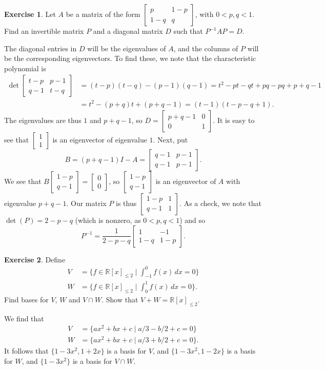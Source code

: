 \documentclass[a4paper]{amsart}
\newcommand{\R}         {{\mathbb{R}}}
\newcommand{\bsm}       {\left[\begin{smallmatrix}}
\newcommand{\esm}       {\end{smallmatrix}\right]}
\newcommand{\bpm}       {\left[\begin{matrix}}
\newcommand{\epm}       {\end{matrix}\right]}
\newcommand{\st}        {\;|\;}
\renewcommand{\:}{\colon}
\theoremstyle{definition}
\newtheorem{exercise}{Exercise}
\newenvironment{solution}{{\noindent \bf Solution:}}{}
\begin{document}
\begin{exercise}
 Let $A$ be a matrix of the form
 $\bpm p & 1-p \\ 1-q & q\epm$, with $0<p,q<1$.  Find an
 invertible matrix $P$ and a diagonal matrix $D$ such that
 $P^{-1}AP=D$.  
\end{exercise}
\begin{solution}
 The diagonal entries in $D$ will be the eigenvalues of $A$,
 and the columns of $P$ will be the corresponding
 eigenvectors.  To find these, we note that the
 characteristic polynomial is
 \begin{align*}
  \det\bpm t-p & p-1 \\ q-1 & t-q \epm 
   &= (t-p)(t-q) - (p-1)(q-1) 
    = t^2 - pt - qt + pq - pq + p + q - 1 \\
   &= t^2-(p+q)t+(p+q-1) 
    = (t-1)(t-p-q+1).
 \end{align*}
 The eigenvalues are thus $1$ and $p+q-1$, so
 $D=\bpm p+q-1&0\\0&1\epm$.  It is easy to see that
 $\bsm 1\\1\esm$ is an eigenvector of eigenvalue $1$.  Next,
 put 
 \[ B = (p+q-1)I - A = \bpm q-1 & p-1 \\ q-1 & p-1 \epm. \]
 We see that $B\bsm 1-p\\ q-1\esm=\bsm 0\\ 0\esm$, so
 $\bsm 1-p\\ q-1\esm$ is an eigenvector of $A$ with
 eigenvalue $p+q-1$.  Our matrix $P$ is thus
 $\bpm 1-p&1\\q-1&1\epm$.  As a check, we note that 
 $\det(P)=2-p-q$ (which is nonzero, as $0<p,q<1$) and so 
 \[ P^{-1} = \frac{1}{2-p-q}\bpm 1 & -1 \\ 1-q & 1-p \epm. \]
\end{solution}

\begin{exercise}
 Define
 \begin{align*}
  V &= \{f\in\R[x]_{\leq 2} \st \int_{-1}^0 f(x)\,dx=0\} \\
  W &= \{f\in\R[x]_{\leq 2} \st \int_0^1    f(x)\,dx=0\}.
 \end{align*}
 Find bases for $V$, $W$ and $V\cap W$.  Show that
 $V+W=\R[x]_{\leq 2}$.
\end{exercise}
\begin{solution}
 We find that 
 \begin{align*}
  V &= \{ax^2+bx+c\st a/3-b/2+c=0\} \\
  W &= \{ax^2+bx+c\st a/3+b/2+c=0\}.
 \end{align*}
 It follows that $\{1-3x^2,1+2x\}$ is a basis for $V$, and
 $\{1-3x^2,1-2x\}$ is a basis for $W$, and $\{1-3x^2\}$ is a
 basis for $V\cap W$.
\end{solution}
\end{document}
